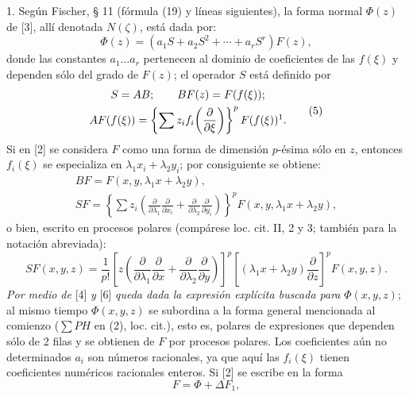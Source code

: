 \documentclass[11pt]{article}
\providecommand{\p}{\partial}
\begin{document}
1. Según Fischer, § 11 (fórmula (19) y líneas siguientes), la forma normal \(\Phi(z)\) de [3], allí denotada \(N(\zeta)\), está dada por:
\begin{equation}
        \Phi(z)=(a_1S+a_2S^2+\cdots+a_rS^r)F(z),
\tag{4}
\end{equation}
donde las constantes \(a_1\ldots a_r\) pertenecen al dominio de coeficientes de las \(f(\xi)\) y dependen sólo del grado de \(F(z)\); el operador \(S\) está definido por
\begin{equation}
\begin{gathered}
        S=AB;\qquad BF(z)=F(f(\xi));\\
        AF(f(\xi))=\left\{\sum z_i f_i\!\left(\frac{\p}{\p\xi}\right)\right\}^{p}F(f(\xi))\footnotemark.
\end{gathered}
\tag{5}
\end{equation}
Si en [2] se considera \(F\) como una forma de dimensión \(p\)-ésima sólo en \(z\), entonces \(f_i(\xi)\) se especializa en \(\lambda_1x_i+\lambda_2y_i\); por consiguiente se obtiene:
\[
\begin{gathered}
        BF=F(x,y,\lambda_1x+\lambda_2y),\\
        SF=\left\{\sum z_i\left(\frac{\p}{\p\lambda_1}\frac{\p}{\p x_i}+
        \frac{\p}{\p\lambda_2}\frac{\p}{\p y_i}\right)\right\}^{p}
        F(x,y,\lambda_1x+\lambda_2y),
\end{gathered}
\]
o bien, escrito en procesos polares (compárese loc. cit. II, 2 y 3; también para la notación abreviada):
\begin{equation}
        SF(x,y,z)=\frac1{p!}\left[z\left(\frac{\p}{\p\lambda_1}\frac{\p}{\p x}+
        \frac{\p}{\p\lambda_2}\frac{\p}{\p y}\right)\right]^p
        \left[(\lambda_1x+\lambda_2y)\frac{\p}{\p z}\right]^p F(x,y,z).
\tag{6}
\end{equation}
\emph{Por medio de} [4] \emph{y} [6] \emph{queda dada la expresión explícita buscada para} \(\Phi(x,y,z)\); al mismo tiempo \(\Phi(x,y,z)\) se subordina a la forma general mencionada al comienzo (\(\sum PH\) en (2), loc. cit.), esto es, polares de expresiones que dependen sólo de 2 filas y se obtienen de \(F\) por procesos polares. Los coeficientes aún no determinados \(a_i\) son números racionales, ya que aquí las \(f_i(\xi)\) tienen coeficientes numéricos racionales enteros. Si [2] se escribe en la forma
\begin{equation}
        F=\Phi+\Delta F_1,
\tag{2a}
\end{equation}
\end{document}
